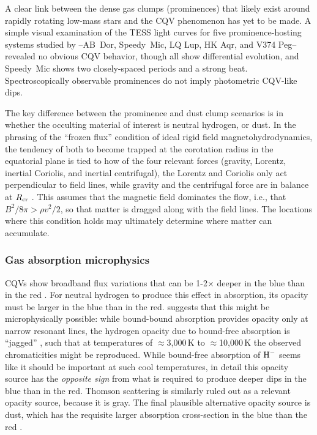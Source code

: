 \documentclass[11pt,twocolumn,tighten]{aastex63}
\begin{document}
A clear link between the dense gas clumps (prominences) that likely
exist around rapidly rotating low-mass stars and the CQV phenomenon
has yet to be made.  A simple visual examination of the TESS light
curves for five prominence-hosting systems studied by
\citet{2019MNRAS.482.2853J}--AB~Dor, Speedy~Mic, LQ Lup, HK Aqr, and
V374 Peg--revealed no obvious CQV behavior, though all show
differential evolution, and Speedy~Mic shows two closely-spaced
periods and a strong beat.  Spectroscopically observable prominences
do not imply photometric CQV-like dips.

The key difference between the prominence and dust clump scenarios is
in whether the occulting material of interest is neutral hydrogen, or
dust.  In the phrasing of the ``frozen flux'' condition of ideal rigid
field magnetohydrodynamics, the tendency of both to become trapped at
the corotation radius in the equatorial plane is tied to how of the
four relevant forces (gravity, Lorentz, inertial Coriolis, and
inertial centrifugal), the Lorentz and Coriolis only act perpendicular
to field lines, while gravity and the centrifugal force are in balance
at $R_{\rm cr}$ \citep[see][Sec.~2]{2005MNRAS.357..251T}.  
This assumes that the magnetic field dominates the flow, i.e., that
$B^2/8\pi > \rho v^2 /2$, so that matter is dragged along with the
field lines.
The locations where this condition holds may ultimately determine where
matter can accumulate.



\subsubsection{Gas absorption microphysics}

CQVs show broadband flux variations that can be 1-2$\times$ deeper in
the blue than in the red
\citep{2017PASJ...69L...2O,2020AJ....160...86B,2022AJ....163..144G,2023MNRAS.518.2921K}.
For neutral hydrogen to produce this effect in absorption, its opacity
must be larger in the blue than in the red.
\citet{1992oasp.book.....G} suggests that this might be
microphysically possible: while bound-bound absorption provides
opacity only at narrow resonant lines, the hydrogen opacity due to
bound-free absorption is ``jagged'' \citep[see][Figure 8.5 and
Eq.~8.8]{1992oasp.book.....G}, such that at temperatures of
$\approx$3{,}000\,K to $\approx$10{,}000\,K the observed
chromaticities might be reproduced.  While bound-free absorption of
${\rm H}^{-}$ seems like it should be important at such cool
temperatures, in detail this opacity source has the {\it opposite
sign} from what is required to produce deeper dips in the blue than in
the red.  Thomson scattering is similarly ruled out as a relevant
opacity source, because it is gray.  The final plausible alternative
opacity source is dust, which has the requisite larger absorption
cross-section in the blue than the red \citep{1989ApJ...345..245C}.
\end{document}
